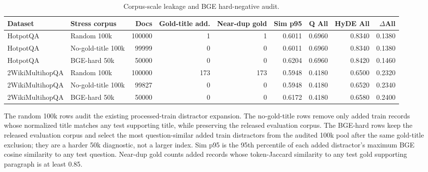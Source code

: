 \begin{table}[t]
\centering
\caption{Corpus-scale leakage and BGE hard-negative audit.}
\label{tab:corpus_scale_audit}
\scriptsize
\begin{threeparttable}
\setlength{\tabcolsep}{3pt}
\begin{tabularx}{\textwidth}{llrrrrrrr}
\toprule
Dataset & Stress corpus & Docs & Gold-title add. & Near-dup gold & Sim p95 & Q All & HyDE All & $\Delta$All \\
\midrule
HotpotQA & Random 100k & 100000 & 1 & 1 & 0.6011 & 0.6960 & 0.8340 & 0.1380 \\
HotpotQA & No-gold-title 100k & 99999 & 0 & 0 & 0.6011 & 0.6960 & 0.8340 & 0.1380 \\
HotpotQA & BGE-hard 50k & 50000 & 0 & 0 & 0.6204 & 0.6960 & 0.8420 & 0.1460 \\
2WikiMultihopQA & Random 100k & 100000 & 173 & 173 & 0.5948 & 0.4180 & 0.6500 & 0.2320 \\
2WikiMultihopQA & No-gold-title 100k & 99827 & 0 & 0 & 0.5948 & 0.4180 & 0.6520 & 0.2340 \\
2WikiMultihopQA & BGE-hard 50k & 50000 & 0 & 0 & 0.6172 & 0.4180 & 0.6580 & 0.2400 \\
\bottomrule
\end{tabularx}
\begin{tablenotes}
\footnotesize
\item The random 100k rows audit the existing processed-train distractor expansion. The no-gold-title rows remove only added train records whose normalized title matches any test supporting title, while preserving the released evaluation corpus. The BGE-hard rows keep the released evaluation corpus and select the most question-similar added train distractors from the audited 100k pool after the same gold-title exclusion; they are a harder 50k diagnostic, not a larger index. Sim p95 is the 95th percentile of each added distractor's maximum BGE cosine similarity to any test question. Near-dup gold counts added records whose token-Jaccard similarity to any test gold supporting paragraph is at least 0.85.
\end{tablenotes}
\end{threeparttable}
\end{table}
